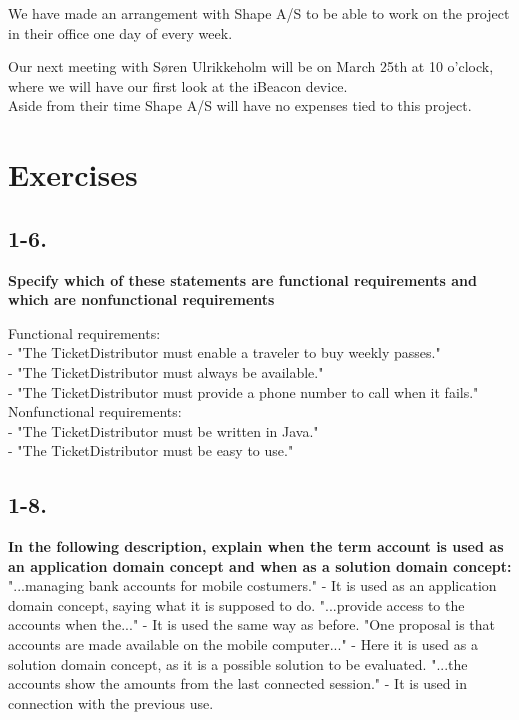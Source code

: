 \documentclass[12pt]{article}
\begin{document}
We have made an arrangement with Shape A/S to be able to work on the project in their office one day of every week.

Our next meeting with S\o ren Ulrikkeholm will be on March 25th at 10 o'clock, where we will have our first look at the iBeacon device.\\

Aside from their time Shape A/S will have no expenses tied to this project.\\










\section{Exercises}
\subsection{1-6.}
\textbf{Specify which of these statements are functional requirements and which are
nonfunctional requirements}

Functional requirements:\\
- "The TicketDistributor must enable a traveler to buy weekly passes."\\
- "The TicketDistributor must always be available."\\
- "The TicketDistributor must provide a phone number to call when it fails."\\

Nonfunctional requirements:\\
- "The TicketDistributor must be written in Java."\\
- "The TicketDistributor must be easy to use."\\









\subsection{1-8.}
\textbf{In the following description, explain when the term account is used as an application domain concept and when as a solution domain concept:}\\
"...managing bank accounts for mobile costumers." - It is used as an application domain concept, saying what it is supposed to do. 
"...provide access to the accounts when the..." - It is used the same way as before. 
"One proposal is that accounts are made available on the mobile computer..." - Here it is used as a solution domain concept, as it is a possible solution to be evaluated. 
"...the accounts show the amounts from the last connected session." - It is used in connection with the previous use.\\
\end{document}
